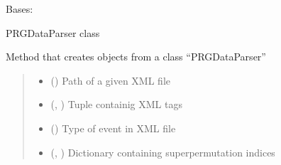 \documentclass[letterpaper,10pt,english]{sphinxmanual}
\begin{document}
\begin{fulllineitems}
\label{\detokenize{xml_parsers:xml_parsers.PRGDataParser}}
\pysigstartsignatures
{}
\pysigstopsignatures
\sphinxAtStartPar
Bases: {\hyperref[\detokenize{xml_parsers:xml_parsers.XmlParser}]{}}

\sphinxAtStartPar
PRGDataParser class

\begin{fulllineitems}
\label{\detokenize{xml_parsers:xml_parsers.PRGDataParser.__init__}}
\pysigstartsignatures
{}
\pysigstopsignatures
\sphinxAtStartPar
Method that creates objects from a class “PRGDataParser”
\begin{quote}\begin{description}
\begin{itemize}
\item {} 
\sphinxAtStartPar
{} () \textendash{} Path of a given XML file

\item {} 
\sphinxAtStartPar
{} (\sphinxcode{\sphinxupquote{Tuple}}{[}, \sphinxcode{\sphinxupquote{...}}{]}) \textendash{} Tuple containig XML tags

\item {} 
\sphinxAtStartPar
{} () \textendash{} Type of event in XML file

\item {} 
\sphinxAtStartPar
{} (\sphinxcode{\sphinxupquote{Dict}}{[}, \sphinxcode{\sphinxupquote{List}}{[}\sphinxcode{\sphinxupquote{int}}{]}{]}) \textendash{} Dictionary containing superpermutation indices


\end{itemize}
\end{description}
\end{quote}
\end{fulllineitems}
\end{fulllineitems}
\end{document}

